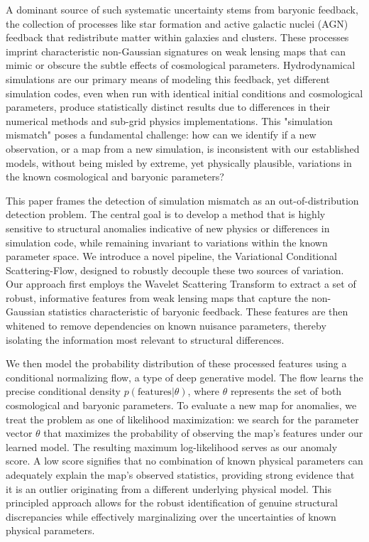 \documentclass[]{article}
\begin{document}
A dominant source of such systematic uncertainty stems from baryonic feedback, the collection of processes like star formation and active galactic nuclei (AGN) feedback that redistribute matter within galaxies and clusters. These processes imprint characteristic non-Gaussian signatures on weak lensing maps that can mimic or obscure the subtle effects of cosmological parameters. Hydrodynamical simulations are our primary means of modeling this feedback, yet different simulation codes, even when run with identical initial conditions and cosmological parameters, produce statistically distinct results due to differences in their numerical methods and sub-grid physics implementations. This "simulation mismatch" poses a fundamental challenge: how can we identify if a new observation, or a map from a new simulation, is inconsistent with our established models, without being misled by extreme, yet physically plausible, variations in the known cosmological and baryonic parameters?

This paper frames the detection of simulation mismatch as an out-of-distribution detection problem. The central goal is to develop a method that is highly sensitive to structural anomalies indicative of new physics or differences in simulation code, while remaining invariant to variations within the known parameter space. We introduce a novel pipeline, the Variational Conditional Scattering-Flow, designed to robustly decouple these two sources of variation. Our approach first employs the Wavelet Scattering Transform to extract a set of robust, informative features from weak lensing maps that capture the non-Gaussian statistics characteristic of baryonic feedback. These features are then whitened to remove dependencies on known nuisance parameters, thereby isolating the information most relevant to structural differences.

We then model the probability distribution of these processed features using a conditional normalizing flow, a type of deep generative model. The flow learns the precise conditional density $p(\text{features} | \theta)$, where $\theta$ represents the set of both cosmological and baryonic parameters. To evaluate a new map for anomalies, we treat the problem as one of likelihood maximization: we search for the parameter vector $\theta$ that maximizes the probability of observing the map's features under our learned model. The resulting maximum log-likelihood serves as our anomaly score. A low score signifies that no combination of known physical parameters can adequately explain the map's observed statistics, providing strong evidence that it is an outlier originating from a different underlying physical model. This principled approach allows for the robust identification of genuine structural discrepancies while effectively marginalizing over the uncertainties of known physical parameters.
\end{document}
